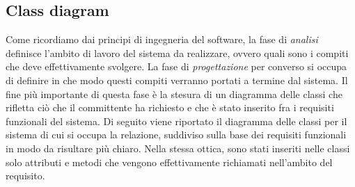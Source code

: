 \documentclass[12pt,a4paper,onecolumn,x11names]{article}
\begin{document}
	\subsection{Class diagram}
	\begin{flushleft}
		Come ricordiamo dai principi di ingegneria del software, la fase di \textit{analisi} definisce l'ambito di lavoro del sistema da realizzare, ovvero quali sono i compiti che deve effettivamente svolgere. La fase di \textit{progettazione} per converso si occupa di definire in che modo questi compiti verranno portati a termine dal sistema.\newline
		Il fine più importante di questa fase è la stesura di un diagramma delle classi che rifletta ciò che il committente ha richiesto e che è stato inserito fra i requisiti funzionali del sistema.
		Di seguito viene riportato il diagramma delle classi per il sistema di cui si occupa la relazione, suddiviso sulla base dei requisiti funzionali in modo da risultare più chiaro. Nella stessa ottica, sono stati inseriti nelle classi solo attributi e metodi che vengono effettivamente richiamati nell'ambito del requisito.\newline\newline
	\end{flushleft}
\end{document}
